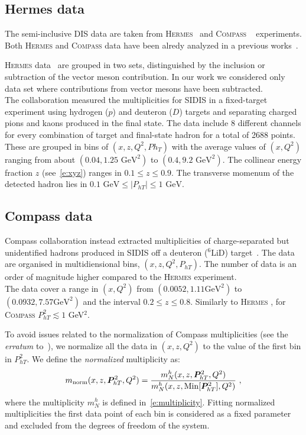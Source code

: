 \documentclass[aps,preprintnumbers,showpacs,nofootinbib,superscriptaddress,floatfix]{revtex4}
\newcommand{\hermes}{\textsc{Hermes }}
\newcommand{\compass}{\textsc{Compass }}
\newcommand{\Tperp}{T}
\begin{document}
\subsection{Hermes data}
\label{ss:hermes}

The semi-inclusive DIS data are taken from \textsc{Hermes}~\cite{Airapetian:2012ki} and \compass~\cite{Adolph:2013stb} experiments. 
Both \textsc{Hermes} and \compass data have been alredy analyzed in a previous works~\cite{Signori:2013mda,Anselmino:2013lza}.

\textsc{Hermes} data~\cite{Airapetian:2012ki} are grouped in two sets, distinguished by the inclusion or subtraction of the vector meson contribution. In our work we considered only data set where contributions from vector mesons have been subtracted. \\
The collaboration measured the multiplicities for SIDIS in a fixed-target experiment using hydrogen ($p$) and deuteron ($D$) targets and separating charged pions and kaons produced in the final state. The data include 8 different channels for every combination of target and final-state hadron for a total of 2688 points.\\
These are grouped in bins of $(x,z,Q^2,Ph_T)$ with the average values of $(x,Q^2)$ ranging from about $(0.04, 1.25\text{ GeV}^2)$ to $(0.4, 9.2\text{ GeV}^2)$. 
The collinear energy fraction $z$ (see~\eqref{e:xyz}) ranges in $0.1\leq z\leq 0.9$. The transverse momenum of the detected hadron lies in $0.1 \text{ GeV} \leq \vert P_{hT} \vert \leq 1 \text{ GeV}$.

\subsection{Compass data}
\label{ss:compass}

Compass collaboration instead extracted multiplicities of charge-separated but unidentified hadrons produced in SIDIS off a deuteron ($^6\text{LiD}$) target~\cite{Adolph:2013stb}. 
The data are organised in multidiensional bins, $(x,z,Q^2,P_{h\Tperp})$. The number of data is an order of magnitude higher compared to the \textsc{Hermes} experiment. \\
The data cover a range in $(x,Q^2)$ from $(0.0052, 1.11\text{GeV}^2)$ to $(0.0932, 7.57\text{GeV}^2)$ and the interval $0.2 \leq z \leq 0.8$. Similarly to \hermes, for \compass $P_{h\Tperp}^2 \lesssim 1$ GeV$^2$. 

To avoid issues related to the normalization of Compass multiplicities (see the {\em erratum} to~\cite{Adolph:2013stb}), we normalize all the data in $(x,z,Q^2)$ to the value of the first bin in $P_{h\Tperp}^2$. We define the {\em normalized} multiplicity as:
\begin{equation}
m_{\text{norm}}(x,z,\bm{P}_{h\Tperp}^2, Q^2) = \frac{m_N^h(x,z,\bm{P}_{h\Tperp}^2, Q^2)}{m_N^h (x,z,{\rm Min}[\bm{P}_{h\Tperp}^2], Q^2)} \ ,
\label{e:mult_norm}
\end{equation}
where the multiplicity $m_N^h$ is defined in~\eqref{e:multiplicity}. Fitting normalized multiplicities the first data point of each bin is considered as a fixed parameter and excluded from the degrees of freedom of the system.
\end{document}
